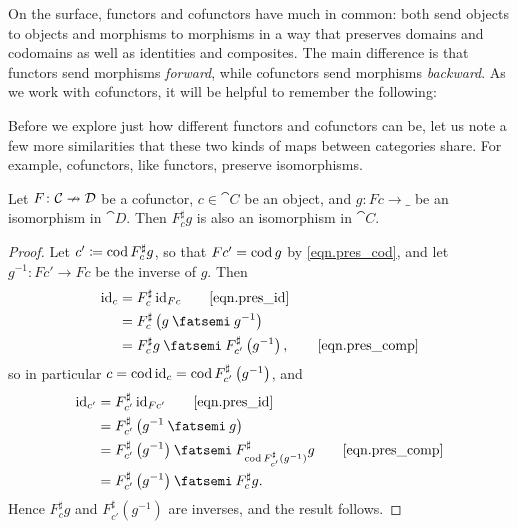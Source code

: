 \documentclass[Book-Poly]{subfiles}
\begin{document}
On the surface, functors and cofunctors have much in common: both send objects to objects and morphisms to morphisms in a way that preserves domains and codomains as well as identities and composites.
The main difference is that functors send morphisms \emph{forward}, while cofunctors send morphisms \emph{backward}.
As we work with cofunctors, it will be helpful to remember the following:

Before we explore just how different functors and cofunctors can be, let us note a few more similarities that these two kinds of maps between categories share.
For example, cofunctors, like functors, preserve isomorphisms.

\begin{proposition}\label{prop.cofunctors_isos}
Let $F\colon\mathcal{C}\nrightarrow\mathcal{D}$ be a cofunctor, $c\in\cat{C}$ be an object, and $g\colon Fc\to\_$ be an isomorphism in $\cat{D}$.
Then $F^\sharp_c g$ is also an isomorphism in $\cat{C}$.
\end{proposition}
\begin{proof}
Let $c'\coloneqq\operatorname{cod} F^\sharp_c g$, so that $Fc'=\operatorname{cod} g$ by \eqref{eqn.pres_cod}, and let $g^{-1}\colon Fc'\to Fc$ be the inverse of $g$.
Then
\begin{align*}
	\id_c&=
	F^\sharp_c\,\id_{Fc} \tag*{\eqref{eqn.pres_id}}\\&=
	F^\sharp_c\left(g\then g^{-1}\right)\\&=
	F^\sharp_c g\then F^\sharp_{c'}\left(g^{-1}\right), \tag*{\eqref{eqn.pres_comp}}
\end{align*}
so in particular $c=\operatorname{cod}\mathrm{id}_c=\operatorname{cod} F^\sharp_{c'}\left(g^{-1}\right)$, and
\begin{align*}
	\id_{c'}&=
	F^\sharp_{c'}\,\id_{Fc'} \tag*{\eqref{eqn.pres_id}}\\&=
	F^\sharp_{c'}\left(g^{-1}\then g\right)\\&=
	F^\sharp_{c'}\left(g^{-1}\right)\then F^\sharp_{\cod F^\sharp_{c'}\left(g^{-1}\right)}g \tag*{\eqref{eqn.pres_comp}}\\&=
	F^\sharp_{c'}\left(g^{-1}\right)\then F^\sharp_c g.
\end{align*}
Hence $F^\sharp_c g$ and $F^\sharp_{c'}\left(g^{-1}\right)$ are inverses, and the result follows.
\end{proof}
\end{document}
